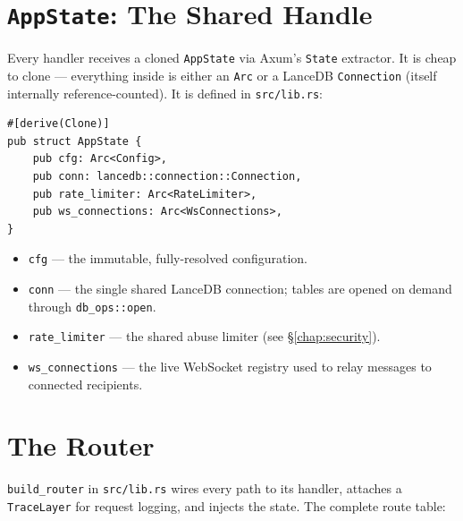 \section{\texttt{AppState}: The Shared Handle}

Every handler receives a cloned \verb|AppState| via Axum's \verb|State| extractor.
It is cheap to clone --- everything inside is either an \verb|Arc| or a LanceDB
\verb|Connection| (itself internally reference-counted). It is defined in
\verb|src/lib.rs|:

\begin{lstlisting}
#[derive(Clone)]
pub struct AppState {
    pub cfg: Arc<Config>,
    pub conn: lancedb::connection::Connection,
    pub rate_limiter: Arc<RateLimiter>,
    pub ws_connections: Arc<WsConnections>,
}
\end{lstlisting}

\begin{itemize}
  \item \verb|cfg| --- the immutable, fully-resolved configuration.
  \item \verb|conn| --- the single shared LanceDB connection; tables are opened
        on demand through \verb|db_ops::open|.
  \item \verb|rate_limiter| --- the shared abuse limiter (see
        \S\ref{chap:security}).
  \item \verb|ws_connections| --- the live WebSocket registry used to relay
        messages to connected recipients.
\end{itemize}

\section{The Router}

\verb|build_router| in \verb|src/lib.rs| wires every path to its handler,
attaches a \verb|TraceLayer| for request logging, and injects the state. The
complete route table:

